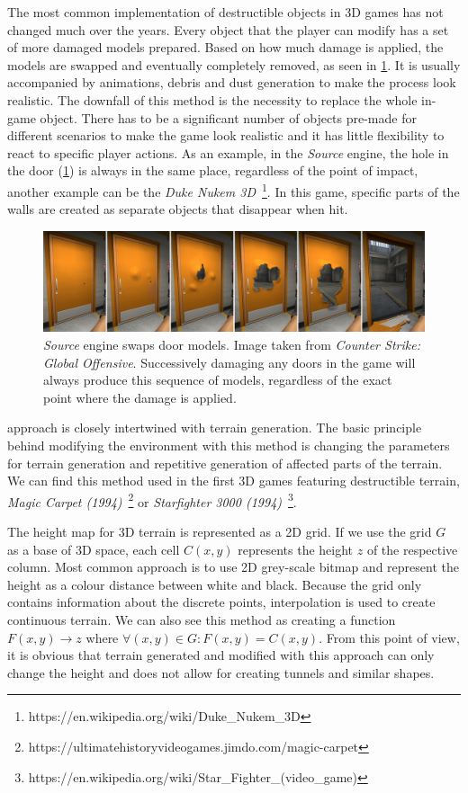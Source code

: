 The most common implementation of destructible objects in 3D games has not changed much over the years. Every object that the player can modify has a set of more damaged models prepared. Based on how much damage is applied, the models are swapped and eventually completely removed, as seen in \cref{fig:doors}. It is usually accompanied by animations, debris and dust generation to make the process look realistic. The downfall of this method is the necessity to replace the whole in-game object. There has to be a significant number of objects pre-made for different scenarios to make the game look realistic and it has little flexibility to react to specific player actions. As an example, in the \emph{Source} engine, the hole in the door (\cref{fig:doors}) is always in the same place, regardless of the point of impact, another example can be the \emph{Duke Nukem 3D}~\footnote{https://en.wikipedia.org/wiki/Duke\_Nukem\_3D}. In this game, specific parts of the walls are created as separate objects that disappear when hit.

\begin{figure} 
\centering
\includegraphics[width=\textwidth]{img/doors}
\caption{\emph{Source} engine swaps door models. Image taken from \emph{Counter Strike: Global Offensive}. Successively damaging any doors in the game will always produce this sequence of models, regardless of the exact point where the damage is applied.}
\label{fig:doors}
\end{figure}

 approach is closely intertwined with terrain generation. The basic principle behind modifying the environment with this method is changing the parameters for terrain generation and repetitive generation of affected parts of the terrain. We can find this method used in the first 3D games featuring destructible terrain, \eg \emph{Magic Carpet (1994)}~\footnote{https://ultimatehistoryvideogames.jimdo.com/magic-carpet} or \emph{Starfighter 3000 (1994)}~\footnote{https://en.wikipedia.org/wiki/Star\_Fighter\_(video\_game)}.

The height map for 3D terrain is represented as a 2D grid. If we use the grid $G$ as a base of 3D space, each cell $C(x,y)$ represents the height $z$ of the respective column. Most common approach is to use 2D grey-scale bitmap and represent the height as a colour distance between white and black. Because the grid only contains information about the discrete points, interpolation is used to create continuous terrain. We can also see this method as creating a function $F(x,y) \rightarrow z$ where $\forall (x,y) \in G : F(x,y) = C(x,y)$. From this point of view, it is obvious that terrain generated and modified with this approach can only change the height and does not allow for creating tunnels and similar shapes.

